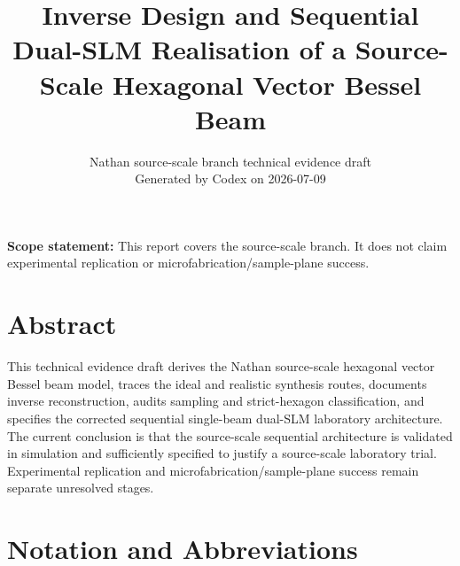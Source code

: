 \documentclass[11pt,a4paper]{report}
\title{Inverse Design and Sequential Dual-SLM Realisation of a Source-Scale Hexagonal Vector Bessel Beam}
\author{Nathan source-scale branch technical evidence draft\\Generated by Codex on 2026-07-09}
\date{}
\begin{document}
\maketitle

\begin{center}\textbf{Scope statement:} This report covers the source-scale branch. It does not claim experimental replication or microfabrication/sample-plane success.\end{center}

\tableofcontents

\listoffigures

\chapter*{Abstract}


This technical evidence draft derives the Nathan source-scale hexagonal vector Bessel beam model, traces the ideal and realistic synthesis routes, documents inverse reconstruction, audits sampling and strict-hexagon classification, and specifies the corrected sequential single-beam dual-SLM laboratory architecture. The current conclusion is that the source-scale sequential architecture is validated in simulation and sufficiently specified to justify a source-scale laboratory trial. Experimental replication and microfabrication/sample-plane success remain separate unresolved stages.

\chapter*{Notation and Abbreviations}

\end{document}
